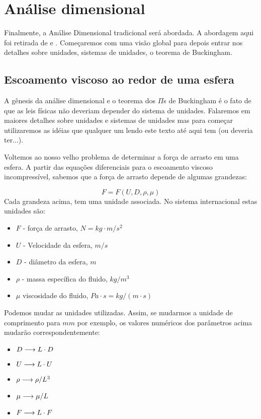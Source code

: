 \section{Análise dimensional}
\label{sec:adim}

Finalmente, a Análise Dimensional tradicional será abordada. A abordagem aqui foi retirada de  e . Começaremos com  uma visão global para depois entrar nos detalhes sobre unidades, sistemas de unidades, o teorema de Buckingham.

\subsection{Escoamento viscoso ao redor de uma esfera}

A gênesis da análise dimensional e o teorema dos $\Pi$s de Buckingham é o fato de que as leis físicas não deveriam depender do sistema de unidades. Falaremos em maiores detalhes sobre unidades e sistemas de unidades mas para começar utilizaremos as idéias que qualquer um lendo este texto até aqui tem (ou deveria ter...).

Voltemos ao nosso velho problema de determinar a força de arrasto em uma esfera. A partir das equações diferenciais para o escoamento viscoso incompressível, sabemos que a força de arrasto depende de algumas grandezas:

\[
F = F(U, D, \rho, \mu)
\]
Cada grandeza acima, tem uma unidade associada. No sistema internacional estas unidades são:

\begin{itemize}
\item $F$ - força de arrasto, $N=kg\cdot m/s^2$
\item $U$ - Velocidade da esfera, $m/s$
\item $D$ - diâmetro da esfera, $m$
\item $\rho$ - massa específica do fluido, $kg/m^3$
\item $\mu$ viscosidade do fluido, $Pa\cdot s = kg/(m\cdot s)$
\end{itemize}

Podemos mudar as unidades utilizadas. Assim, se mudarmos a unidade de comprimento para $mm$ por exemplo, os valores numéricos dos parâmetros acima mudarão correspondentemente:

\begin{itemize}
\item $D \longrightarrow L \cdot D$
\item $U \longrightarrow L \cdot U$
\item $\rho \longrightarrow  \rho / L^3$
\item $\mu \longrightarrow \mu / L$
\item $F \longrightarrow L \cdot F$
\end{itemize}

